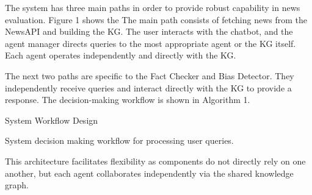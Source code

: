 \documentclass[11pt]{article}
\begin{document}
The system has three main paths in order to provide robust capability in news evaluation. Figure 1 shows the  The main path consists of fetching news from the NewsAPI and building the KG. The user interacts with the chatbot, and the agent manager directs queries to the most appropriate agent or the KG itself. Each agent operates independently and directly with the KG.

The next two paths are specific to the Fact Checker and Bias Detector. They independently receive queries and interact directly with the KG to provide a response. The decision-making workflow is shown in Algorithm 1.

\renewcommand{\thealgocf}{1}
\begin{algorithm}[H]
\caption{System Workflow Design}





\caption{System decision making workflow for processing user queries.}
\end{algorithm}

This architecture facilitates flexibility as components do not directly rely on one another, but each agent collaborates independently via the shared knowledge graph. 
\end{document}
